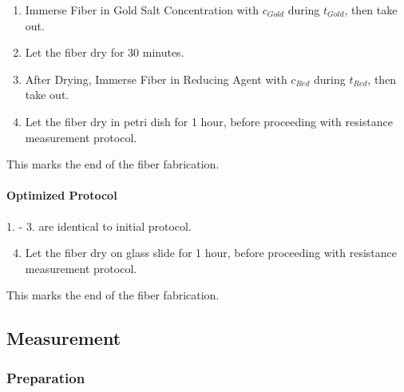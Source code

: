 \begin{enumerate}
	
	\item Immerse Fiber in Gold Salt Concentration with $c_{Gold}$ during $t_{Gold}$, then take out.

	\item Let the fiber dry for 30 minutes.
	
	\item After Drying, Immerse Fiber in Reducing Agent with $c_{Red}$ during $t_{Red}$, then take out.
	
	\item Let the fiber dry in petri dish for 1 hour, before proceeding with resistance measurement protocol.

    \end{enumerate}
    
    \begin{center}
        This marks the end of the fiber fabrication.
    \end{center}


\paragraph{Optimized Protocol} \hfill\newline

1. - 3. are identical to initial protocol.

\begin{enumerate}
\setcounter{enumi}{3}
	
	\item Let the fiber dry on glass slide for 1 hour, before proceeding with resistance measurement protocol.


\end{enumerate}
    
    \begin{center}
        This marks the end of the fiber fabrication.
    \end{center}

\subsection{Measurement}

\subsubsection{Preparation}

